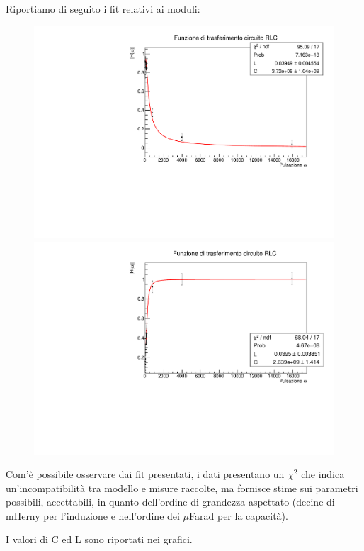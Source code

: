 Riportiamo di seguito i fit relativi ai moduli:

\begin{figure}[H]
    \centering
    \includegraphics[scale=.4]{Immagini/trasferimento RLC.pdf}
    \\
    \includegraphics[scale=.4]{Immagini/trasferimento RLC 2.pdf}
    \caption{}
\end{figure}

Com'è possibile osservare dai fit presentati, i dati presentano un $\chi ^{2}$ che indica un’incompatibilità tra modello e misure raccolte, ma fornisce stime sui parametri possibili,
accettabili, in quanto dell’ordine di grandezza aspettato (decine di mHerny per l’induzione e nell’ordine dei $\mu$Farad per la capacità).

I valori di C ed L sono riportati nei grafici.

